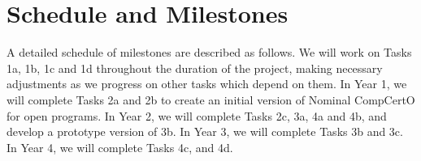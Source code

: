 \section{Schedule and Milestones}

A detailed schedule of milestones are described as follows.
We will work on Tasks 1a, 1b, 1c and 1d throughout the duration of the project,
making necessary adjustments as we progress on other tasks
which depend on them.
In Year 1, 
we will complete Tasks 2a and 2b to
create an initial version of Nominal CompCertO for open programs.
In Year 2, we will complete Tasks 2c, 3a, 4a and 4b, and
develop a prototype version of 3b.
In Year 3, 
we will complete Tasks 3b and 3c.
In Year 4, we will complete Tasks 4c, and 4d.


